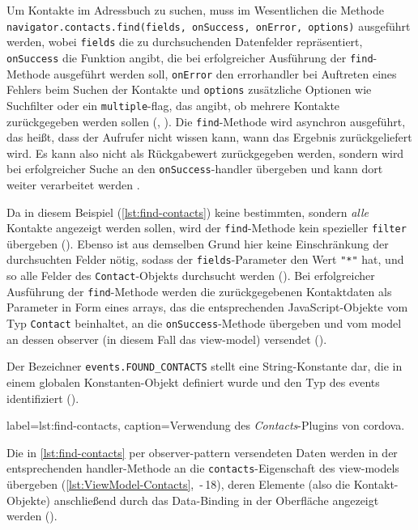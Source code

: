 Um Kontakte im Adressbuch zu suchen, muss im Wesentlichen die Methode \lstinline|navigator.contacts.find(fields, onSuccess, onError, options)| ausgeführt werden, wobei \lstinline|fields| die zu durchsuchenden Datenfelder repräsentiert, \lstinline|onSuccess| die Funktion angibt, die bei erfolgreicher Ausführung der \lstinline|find|-Methode ausgeführt werden soll, \lstinline|onError| den \gls{errorhandler} bei Auftreten eines Fehlers beim Suchen der Kontakte und \lstinline|options| zusätzliche Optionen wie Suchfilter oder ein \lstinline|multiple|-\gls{flag}, das angibt, ob mehrere Kontakte zurückgegeben werden sollen (, ).
Die \lstinline|find|-Methode wird \gls{asynchron} ausgeführt, das heißt, dass der Aufrufer nicht wissen kann, wann das Ergebnis zurückgeliefert wird.
Es kann also nicht als Rückgabewert zurückgegeben werden, sondern wird bei erfolgreicher Suche an den \og \lstinline|onSuccess|-\gls{handler} übergeben und kann dort weiter verarbeitet werden \cite{Cordova_Plugin_Registry_Contacts}.

Da in diesem Beispiel (\autoref{lst:find-contacts}) keine bestimmten, sondern \emph{alle} Kontakte angezeigt werden sollen, wird der \lstinline|find|-Methode kein spezieller \lstinline|filter| übergeben (). 
Ebenso ist aus demselben Grund hier keine Einschränkung der durchsuchten Felder nötig, sodass der \lstinline|fields|-Parameter den Wert \lstinline|"*"| hat, und so alle Felder des \lstinline|Contact|-Objekts durchsucht werden ().
Bei erfolgreicher Ausführung der \lstinline|find|-Methode werden die zurückgegebenen Kontaktdaten als Parameter in Form eines \glspl{array}, das die entsprechenden JavaScript-Objekte vom Typ \lstinline|Contact| beinhaltet, an die \lstinline|onSuccess|-Methode übergeben und vom \gls{model} an dessen \gls{observer} (in diesem Fall das \gls{view-model}) versendet (). 

Der Bezeichner \lstinline|events.FOUND_CONTACTS| stellt eine String-Konstante dar, die in einem globalen Konstanten-Objekt definiert wurde und den Typ des \glspl{event} identifiziert ().

	 { label=lst:find-contacts, caption={Verwendung des \emph{Contacts}-Plugins von \gls{cordova}.}}

Die in \autoref{lst:find-contacts} per \gls{observer-pattern} versendeten Daten werden in der entsprechenden \gls{handler}-Methode an die \lstinline|contacts|-Eigenschaft des \glspl{view-model} übergeben (\autoref{lst:ViewModel-Contacts}, \,-\,18), deren Elemente (also die Kontakt-Objekte) anschließend durch das Data-Binding in der Oberfläche angezeigt werden (\su).

